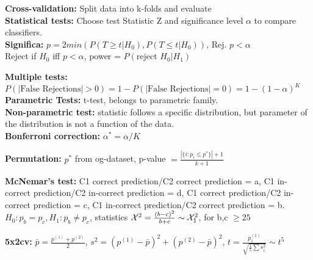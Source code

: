\textbf{Cross-validation:} Split data into k-folds and evaluate\\
\textbf{Statistical tests:} Choose test Statistic Z and significance level $\alpha$ to compare classifiers.\\

\textbf{Significa:} $p = 2min(P(T\geq t | H_0), P(T\leq t| H_0))$, Rej. $p<\alpha$\\
Reject if $H_0$ iff $p<\alpha$, power = $P(\text{reject } H_0 | H_1)$
\begin{comment}
	The statistical power increases with increasing sample size.\\
\end{comment}

\textbf{Multiple tests:} $P(|\text{False Rejections}| > 0) = 1 - P(|\text{False Rejections}| = 0) = 1-(1-\alpha)^K$\\

\textbf{Parametric Tests:} t-test, belongs to parametric family.\\
\textbf{Non-parametric test:} statistic follows a specific distribution, but parameter of the distribution is not a function of the data.\\

\textbf{Bonferroni correction:} $\alpha^* = \alpha/K$

\textbf{Permutation:} $p^*$ from og-dataset, p-value $= \frac{|\{ i:p_i \leq p^* \}| + 1}{k+1}$\\
\begin{comment}
	We evaluate p* on our original dataset. We then permute the labels y randomly k times, train the model again, and compute the error $p_k$ for every permutation. 
	The empirical p-value is the computed as stated above, measuring whether a classifier performs better than random chance.\\
\end{comment}

\textbf{McNemar's test:} C1 correct prediction/C2 correct prediction = a, C1 in-correct prediction/C2 in-correct prediction = d, C1 correct prediction/C2 in-correct prediction = c, C1 in-correct prediction/C2 correct prediction = b. 
$H_0: p_b = p_c, H_1: p_b \neq p_c$, statistics $\mathcal{X}^2 = \frac{(b-c)^2}{b+c} \sim \mathcal{X}_1^2$, for b,c $\geq 25$

\textbf{5x2cv:} $\bar{p} = \frac{p^{(1)} + p^{(2)}}{2}$, $s^2 = (p^{(1)} - \bar{p})^2 + (p^{(2)} - \bar{p})^2$, $t = \frac{p^{(1)}_1}{\sqrt{\frac{1}{5} \sum s_i^2}} \sim t^5$\\
\begin{comment}
	We do 5 iterations, where each iteration we split the dataset in two folds. For each fold compare performance between two classifiers and obtain the test statistic.\\
\end{comment}


